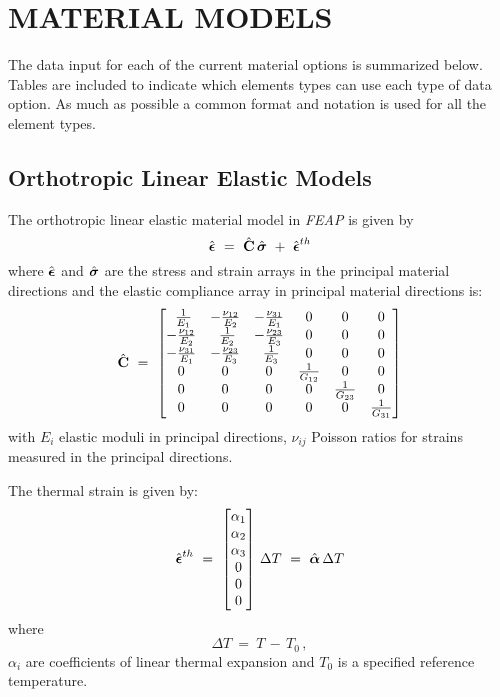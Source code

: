 \chapter[Material Models]{MATERIAL MODELS}
\label{matmods}

The data input for each of the current material options is summarized
below.  Tables are included to indicate which elements types can use
each type of data option.  As much as possible a common format and
notation is used for all the element types.

\section{Orthotropic Linear Elastic Models}
\label{orthel}

The orthotropic linear elastic material model in {\sl FEAP} is
given by
\begin{equation}
 \hat{\boldsymbol{\epsilon}}
~=~ \hat{\mathbf{C}} \, \hat{\boldsymbol{\sigma}} ~+~ \hat{\boldsymbol{\epsilon}}^{th}
\end{equation}
where $\hat{\boldsymbol{\epsilon}}$ and $\hat{\boldsymbol{\sigma}}$ are the stress and strain
arrays in the principal material directions and the elastic compliance array
in principal material directions is:
\begin{equation}
\hat{\mathbf{C}} ~=~ \left[
\begin{matrix}
~\frac{1}{E_1} & - \frac{\nu_{12}}{E_2} & - \frac{\nu_{31}}{E_1} & 0 & 0 & 0 \\
- \frac{\nu_{12}}{E_2} & ~\frac{1}{E_2} & - \frac{\nu_{23}}{E_3} & 0 & 0 & 0 \\
- \frac{\nu_{31}}{E_1} & - \frac{\nu_{23}}{E_3} & ~\frac{1}{E_3} & 0 & 0 & 0 \\
0 & 0 & 0 & \frac{1}{G_{12}} & 0 & 0 \\
0 & 0 & 0 & 0 & \frac{1}{G_{23}} & 0 \\
0 & 0 &0 & 0 & 0 & \frac{1}{G_{31}} \\
\end{matrix} \right]
\end{equation}
with $E_i$ elastic moduli in principal directions, $\nu_{ij}$ Poisson ratios
for strains measured in the principal directions.

The thermal strain is given by:
\begin{equation}
\hat{\boldsymbol{\epsilon}}^{th} ~=~ \left[
\begin{matrix}
\alpha_1 \\ \alpha_2 \\ \alpha_3 \\ 0 \\ 0 \\ 0 \\
\end{matrix} \right]
\, \Delta T ~=~ \hat{\boldsymbol{\alpha}} \, \Delta T
\end{equation}
where
\begin{equation}
\Delta T ~=~ T\, - \, T_0 \, ,
\end{equation}
$\alpha_i$ are coefficients of linear thermal expansion and
$T_0$ is a specified reference temperature.

